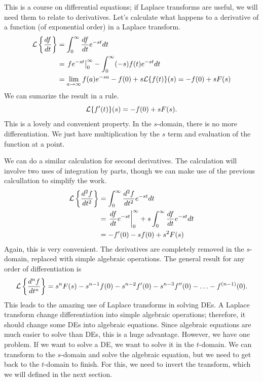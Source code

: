 \documentclass[fleqn,letterpaper]{report}
\begin{document}
This is a course on differential equations; if Laplace
transforms are useful, we will need them to relate to
derivatives. Let's calculate what happens to a derivative of
a function (of exponential order) in a Laplace transform.
\begin{align*}
\mathcal{L} \left\{ \frac{df}{dt} \right\} & = \int_0^\infty
\frac{df}{dt} e^{-st} dt \\
& = \left. fe^{-st} \right|_0^\infty - \int_0^\infty (-s) f(t)
e^{-st} dt \\
& = \lim_{a \rightarrow \infty} f(a) e^{-sa} - f(0) + s \mathcal{L} \{
f(t) \} (s) = -f(0) + s F(s)
\end{align*} 
We can sumarize the result in a rule.
\begin{equation*}
\mathcal{L} \{ f^\prime(t) \} (s) = -f(0) + sF(s).
\end{equation*}
This is a lovely and convenient property. In the $s$-domain,
there is no more differentiation. We just have multiplication
by the $s$ term and evaluation of the function at a point. 

We can do a similar calculation for second derivatives. The
calculation will involve two uses of integration by parts,
though we can make use of the previous calcullation to
simplify the work.
\begin{align*}
\mathcal{L} \left\{ \frac{d^2f}{dt^2} \right\} & = \int_0^\infty
\frac{d^2f}{dt^2} e^{-st} dt \\
& = \left. \frac{df}{dt} e^{-st} \right|_0^\infty +
s\int_0^\infty \frac{df}{dt} e^{-st} dt \\
& = -f^\prime(0) - sf(0) + s^2 F(s)
\end{align*} 
Again, this is very convenient. The derivatives are
completely removed in the $s$-domain, replaced with simple
algebraic operations. The general result for any order of
differentiation is
\begin{equation*}
\mathcal{L} \left\{ \frac{d^n f}{dt^n} \right\} = s^n F(s) - s^{n-1}
f(0) - s^{n-2} f^\prime(0) - s^{n-3} f^{\prime \prime}(0) -
\ldots - f^{(n-1)}(0).
\end{equation*}
This leads to the amazing use of Laplace transforms in solving
DEs. A Laplace transform change differentiation into simple
algebraic operations; therefore, it should change some DEs
into algebraic equations. Since algebraic equations are much
easier to solve than DEs, this is a huge advantage. However,
we have one problem. If we want to solve a DE, we want to
solve it in the $t$-domain. We can transform to the $s$-domain
and solve the algebraic equation, but we need to get back to
the $t$-domain to finish. For this, we need to invert the
transform, which we will defined in the next section. 
\end{document}
